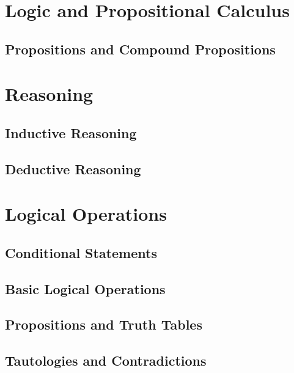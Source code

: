 \documentclass[]{book}
\begin{document}
\section{Logic and Propositional
Calculus}\label{logic-and-propositional-calculus}

\subsection{Propositions and Compound
Propositions}\label{propositions-and-compound-propositions}

\section{Reasoning}\label{reasoning}

\subsection{Inductive Reasoning}\label{inductive-reasoning}

\subsection{Deductive Reasoning}\label{deductive-reasoning}

\section{Logical Operations}\label{logical-operations}

\subsection{Conditional Statements}\label{conditional-statements}

\subsection{Basic Logical Operations}\label{basic-logical-operations}

\subsection{Propositions and Truth
Tables}\label{propositions-and-truth-tables}

\subsection{Tautologies and
Contradictions}\label{tautologies-and-contradictions}
\end{document}
